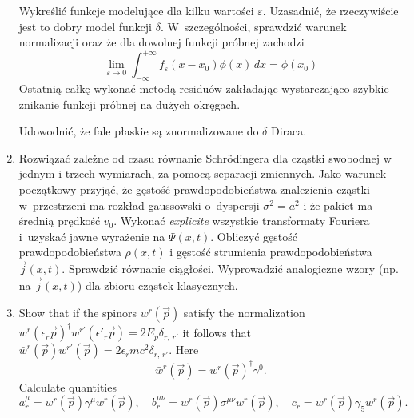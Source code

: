 \documentclass[a4paper,11pt]{article}
\begin{document}
\begin{enumerate}
  Wykreślić funkcje modelujące dla kilku wartości $\varepsilon$. Uzasadnić, że
  rzeczywiście jest to dobry model funkcji $\delta$. W~szczególności,
  sprawdzić warunek normalizacji oraz że dla dowolnej funkcji próbnej
  zachodzi
  \begin{equation}
    \label{eq:5}
    \lim_{ \varepsilon \to 0 } \int_{ -\infty }^{ +\infty } f_{ \varepsilon }( x - x_{ 0 } ) \phi( x ) \, dx
    =
    \phi( x_{ 0 } )
  \end{equation}
  Ostatnią całkę wykonać metodą residuów zakładając wystarczająco
  szybkie znikanie funkcji próbnej na dużych okręgach.

  Udowodnić, że fale płaskie są znormalizowane do $\delta$ Diraca.

\item Rozwiązać zależne od czasu równanie Schr\"{o}dingera dla cząstki
  swobodnej w jednym i trzech wymiarach, za pomocą separacji
  zmiennych. Jako warunek początkowy przyjąć, że gęstość
  prawdopodobieństwa znalezienia cząstki w~przestrzeni ma rozkład
  gaussowski o~dyspersji $\sigma^{ 2 } = a^{ 2 }$ i że pakiet ma
  średnią prędkość $v_{ 0 }$. Wykonać \emph{explicite} wszystkie
  transformaty Fouriera i~uzyskać jawne wyrażenie na $\Psi( x, t )$.
  Obliczyć gęstość prawdopodobieństwa $\rho( x, t )$ i gęstość
  strumienia prawdopodobieństwa $\vec{ j }( x, t )$. Sprawdzić
  równanie ciągłości. Wyprowadzić analogiczne wzory (np. na
  $\vec{ j }( x, t )$) dla zbioru cząstek klasycznych.

\item Show that if the spinors $w^{ r }( \vec{ p } )$ satisfy the
  normalization
  $w^{ r }( \epsilon_{ r } \vec{ p } )^{ \dagger } w^{ r' }(
  \epsilon'_{ r } \vec{ p } ) = 2 E_{ p } \delta_{ r, \, r' }$ it
  follows that
  $\bar{w}^{ r }( \vec{ p } ) w^{ r' }( \vec{ p } ) = 2 \epsilon_{ r }
  m c^{ 2 } \delta_{ r,\, r' }$. Here
  \begin{equation}
    \label{eq:11}
    \bar{w}^{ r }( \vec{ p } )
    = w^{ r }( \vec{ p } )^{ \dagger } \gamma^{ 0 }.
  \end{equation}
  Calculate quantities
  \begin{equation}
    \label{eq:12}
    a_{ r }^{ \mu }
    = \bar{w}^{ r }( \vec{ p } ) \gamma^{ \mu } w^{ r }( \vec{ p } ), \quad
    b_{ r }^{ \mu \nu }
    = \bar{w}^{ r }( \vec{ p } ) \sigma^{ \mu \nu } w^{ r }( \vec{ p } ), \quad
    c_{ r }
    = \bar{w}^{ r }( \vec{ p } ) \gamma_{ 5 } w^{ r }( \vec{ p } ).
  \end{equation}


\end{enumerate}
\end{document}
